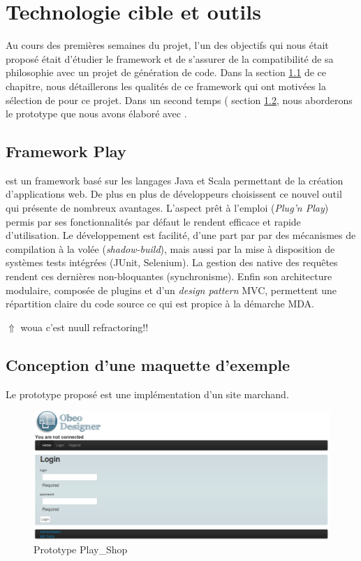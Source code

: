 \chapter{Technologie cible et outils}\label{chap:met}
Au cours des premières semaines du projet, l'un des objectifs qui nous était proposé était d'étudier le framework \play{} et de s'assurer de la compatibilité de sa philosophie avec un projet de génération de code. Dans la section \ref{sec:pla} de ce chapitre, nous détaillerons les qualités de ce framework qui ont motivées la sélection de \play{} pour ce projet. Dans un second temps (\cf{} section \ref{sec:pro}, nous aborderons le prototype que nous avons élaboré avec \play. 


\section{Framework Play}\label{sec:pla}
\play{} est un framework basé sur les langages Java et Scala permettant de la création d'applications web. De plus en plus de développeurs choisissent ce nouvel outil qui présente de nombreux avantages. L'aspect \og prêt à l'emploi \fg{} (\textit{Plug'n Play}) permis par ses fonctionnalités par défaut le rendent efficace et rapide d'utilisation. Le développement est facilité, d'une part par par des mécanismes de compilation à la volée (\textit{shadow-build}), mais aussi par la mise à disposition de systèmes tests intégrées (JUnit, Selenium). La gestion des native des requêtes rendent ces dernières non-bloquantes (synchronisme). Enfin son architecture modulaire, composée de plugins et d'un \textit{design pattern} MVC, permettent une répartition claire du code source ce qui est propice à la démarche MDA.

{\huge $\Uparrow$ woua c'est nuull refractoring!!}



\section{Conception d’une maquette d’exemple}\label{sec:pro}

Le prototype proposé est une implémentation d'un site marchand. 

\begin{figure}[htb]
  \centering
  \includegraphics[scale=.2]{img/proto.eps}
  \caption{Prototype Play\_Shop}
  \label{fig:pro}
\end{figure}



